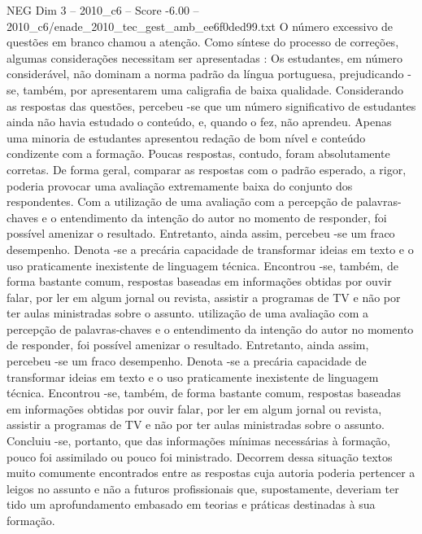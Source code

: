 \begin{textsample}{NEG Dim 3 – 2010\_c6 – Score -6.00 – 2010\_c6/enade\_2010\_tec\_gest\_amb\_ee6f0ded99.txt}
O número excessivo de questões em branco chamou a atenção.
Como síntese do processo de correções, algumas considerações necessitam ser apresentadas : Os estudantes, em número considerável, não dominam a norma padrão da língua portuguesa, prejudicando -se, também, por apresentarem uma caligrafia de baixa qualidade.
Considerando as respostas das questões, percebeu -se que um número significativo de estudantes ainda não havia estudado o conteúdo, e, quando o fez, não aprendeu.
Apenas uma minoria de estudantes apresentou redação de bom nível e conteúdo condizente com a formação.
Poucas respostas, contudo, foram absolutamente corretas.
De forma geral, comparar as respostas com o padrão esperado, a rigor, poderia provocar uma avaliação extremamente baixa do conjunto dos respondentes.
Com a utilização de uma avaliação com a percepção de palavras-chaves e o entendimento da intenção do autor no momento de responder, foi possível amenizar o resultado.
Entretanto, ainda assim, percebeu -se um fraco desempenho.
Denota -se a precária capacidade de transformar ideias em texto e o uso praticamente inexistente de linguagem técnica.
Encontrou -se, também, de forma bastante comum, respostas baseadas em informações obtidas por ouvir falar, por ler em algum jornal ou revista, assistir a programas de TV e não por ter aulas ministradas sobre o assunto. utilização de uma avaliação com a percepção de palavras-chaves e o entendimento da intenção do autor no momento de responder, foi possível amenizar o resultado.
Entretanto, ainda assim, percebeu -se um fraco desempenho.
Denota -se a precária capacidade de transformar ideias em texto e o uso praticamente inexistente de linguagem técnica.
Encontrou -se, também, de forma bastante comum, respostas baseadas em informações obtidas por ouvir falar, por ler em algum jornal ou revista, assistir a programas de TV e não por ter aulas ministradas sobre o assunto.
Concluiu -se, portanto, que das informações mínimas necessárias à formação, pouco foi assimilado ou pouco foi ministrado.
Decorrem dessa situação textos muito comumente encontrados entre as respostas cuja autoria poderia pertencer a leigos no assunto e não a futuros profissionais que, supostamente, deveriam ter tido um aprofundamento embasado em teorias e práticas destinadas à sua formação.

\end{textsample}
